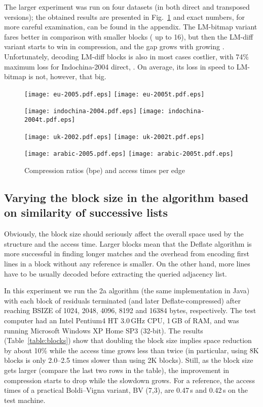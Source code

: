 \documentclass[envcountsame]{llncs}
\begin{document}
The larger experiment was run on four datasets (in both direct and transposed versions); 
the obtained results are presented in Fig.~\ref{fig:times} and exact numbers, for more 
careful examination, can be found in the appendix.
The LM-bitmap variant fares better in comparison with smaller blocks ( up to 16), 
but then the LM-diff variant starts to win in compression, and the gap grows with 
growing .
Unfortunately, decoding LM-diff blocks is also in most cases costlier, 
with 74\% maximum loss for Indochina-2004 direct, .
On average, its loss in speed to LM-bitmap is not, however, that big.

\begin{figure}[pt]
\centerline{
\texttt{[image: eu-2005.pdf.eps]}
\texttt{[image: eu-2005t.pdf.eps]}
}
\centerline{
\texttt{[image: indochina-2004.pdf.eps]}
\texttt{[image: indochina-2004t.pdf.eps]}
}
\centerline{
\texttt{[image: uk-2002.pdf.eps]}
\texttt{[image: uk-2002t.pdf.eps]}
}
\centerline{
\texttt{[image: arabic-2005.pdf.eps]}
\texttt{[image: arabic-2005t.pdf.eps]}
}
\caption[Results]
{Compression ratios (bpe) and access times per edge}
\label{fig:times}
\end{figure}


\subsection{Varying the block size in the algorithm based on similarity of successive lists}


Obviously, the block size should seriously affect the overall space used by the 
structure and the access time. Larger blocks mean that the Deflate algorithm 
is more successful in finding longer matches and the overhead from encoding 
first lines in a block without any reference is smaller. On the other hand, 
more lines have to be usually decoded before extracting the queried adjacency list.

In this experiment we run the 2a algorithm (the same implementation in Java) with 
each block of residuals terminated (and later Deflate-compressed) after 
reaching BSIZE of 1024, 2048, 4096, 8192 and 16384 bytes, respectively. 
The test computer had an Intel Pentium4 HT 3.0\,GHz CPU, 1\,GB of RAM, 
and was running Microsoft Windows XP Home SP3 (32-bit).
The results (Table~\ref{table:blocks}) show that doubling the block size implies 
space reduction by about 10\% while the access time grows less than twice 
(in particular, using 8K blocks is only 2.0--2.5 times slower than using 2K blocks).
Still, as the block size gets larger (compare the last two rows in the table), 
the improvement in compression starts to drop while the slowdown grows.
For a reference, the access times of a practical Boldi--Vigna variant, BV (7,3), 
are 0.47\,s and 0.42\,s on the test machine.
\end{document}
